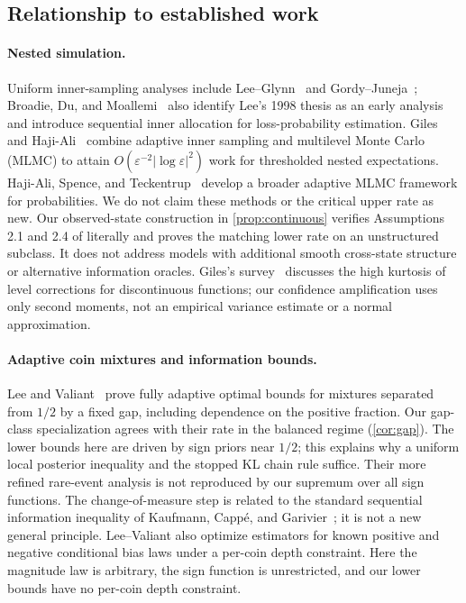 \documentclass[11pt,a4paper]{article}
\theoremstyle{definition}
\begin{document}
\subsection{Relationship to established work}
\paragraph{Nested simulation.}
Uniform inner-sampling analyses include Lee--Glynn~\cite{leeglynn} and
Gordy--Juneja~\cite{gordyjuneja}; Broadie, Du, and Moallemi~\cite{broadie}
also identify Lee's 1998 thesis as an early analysis and introduce sequential
inner allocation for loss-probability estimation.
Giles and Haji-Ali~\cite{gileshajiali} combine adaptive inner sampling and
multilevel Monte Carlo (MLMC) to attain
$O(\varepsilon^{-2}|\log\varepsilon|^2)$ work for thresholded nested expectations.
Haji-Ali, Spence, and Teckentrup~\cite{hajispence} develop a broader adaptive
MLMC framework for probabilities. We do not claim these methods or the
critical upper rate as new. Our observed-state construction in
\cref{prop:continuous} verifies Assumptions 2.1 and 2.4 of
\cite{gileshajiali} literally and proves the matching lower rate on an
unstructured subclass. It does not address models with additional smooth
cross-state structure or alternative information oracles.
Giles's survey~\cite{gilessurvey} discusses the high kurtosis of level
corrections for discontinuous functions; our confidence amplification uses
only second moments, not an empirical variance estimate or a normal approximation.

\paragraph{Adaptive coin mixtures and information bounds.}
Lee and Valiant~\cite{leevaliant} prove fully adaptive optimal bounds for
mixtures separated from $1/2$ by a fixed gap, including dependence on the
positive fraction. Our gap-class specialization agrees with their rate in
the balanced regime (\cref{cor:gap}). The lower bounds here are driven by
sign priors near $1/2$; this explains why a uniform local posterior inequality
and the stopped KL chain rule suffice. Their more refined rare-event
analysis is not reproduced by our supremum over all sign functions.
The change-of-measure step is related to the standard sequential information
inequality of Kaufmann, Capp\'e, and Garivier~\cite{kaufmann}; it is not a
new general principle. Lee--Valiant also optimize estimators for known
positive and negative conditional bias laws under a per-coin depth constraint.
Here the magnitude law is arbitrary, the sign function is unrestricted,
and our lower bounds have no per-coin depth constraint.
\end{document}

